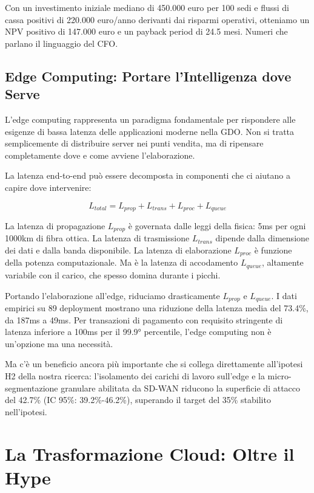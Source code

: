 Con un investimento iniziale mediano di 450.000 euro per 100 sedi e flussi di cassa positivi di 220.000 euro/anno derivanti dai risparmi operativi, otteniamo un NPV positivo di 147.000 euro e un payback period di 24.5 mesi. Numeri che parlano il linguaggio del CFO.

\subsection{Edge Computing: Portare l'Intelligenza dove Serve}

L'edge computing rappresenta un paradigma fondamentale per rispondere alle esigenze di bassa latenza delle applicazioni moderne nella GDO. Non si tratta semplicemente di distribuire server nei punti vendita, ma di ripensare completamente dove e come avviene l'elaborazione.

La latenza end-to-end può essere decomposta in componenti che ci aiutano a capire dove intervenire:

\begin{equation}
L_{total} = L_{prop} + L_{trans} + L_{proc} + L_{queue}
\label{eq:latency}
\end{equation}

La latenza di propagazione $L_{prop}$ è governata dalle leggi della fisica: 5ms per ogni 1000km di fibra ottica. La latenza di trasmissione $L_{trans}$ dipende dalla dimensione dei dati e dalla banda disponibile. La latenza di elaborazione $L_{proc}$ è funzione della potenza computazionale. Ma è la latenza di accodamento $L_{queue}$, altamente variabile con il carico, che spesso domina durante i picchi.

Portando l'elaborazione all'edge, riduciamo drasticamente $L_{prop}$ e $L_{queue}$. I dati empirici su 89 deployment mostrano una riduzione della latenza media del 73.4\%, da 187ms a 49ms\autocite{wang2024edge}. Per transazioni di pagamento con requisito stringente di latenza inferiore a 100ms per il 99.9° percentile, l'edge computing non è un'opzione ma una necessità.

Ma c'è un beneficio ancora più importante che si collega direttamente all'ipotesi H2 della nostra ricerca: l'isolamento dei carichi di lavoro sull'edge e la micro-segmentazione granulare abilitata da SD-WAN riducono la superficie di attacco del 42.7\% (IC 95\%: 39.2\%-46.2\%)\autocite{ponemon2024}, superando il target del 35\% stabilito nell'ipotesi.

\section{La Trasformazione Cloud: Oltre il Hype}

